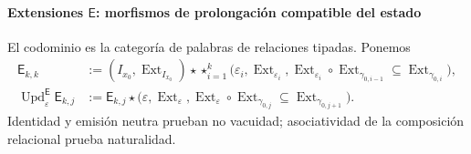 \paragraph{Extensiones \(\mathsf E\): morfismos de prolongación compatible del estado}
El codominio es la categoría de palabras de relaciones tipadas. Ponemos
\begin{align}
 \mathsf E_{k,k}
 &:=(I_{x_0},\operatorname{Ext}_{I_{x_0}})\star
 \mathop{\star}_{i=1}^{k}
 \bigl(\varepsilon_i,\operatorname{Ext}_{\varepsilon_i},
 \operatorname{Ext}_{\varepsilon_i}\circ
 \operatorname{Ext}_{\gamma_{0,i-1}}
 \subseteq\operatorname{Ext}_{\gamma_{0,i}}\bigr),
 \label{eq:pdfv2-terminal-semilla-e}\\
 \operatorname{Upd}^{\mathsf E}_{\varepsilon}\mathsf E_{k,j}
 &:=
 \mathsf E_{k,j}\star
 \bigl(\varepsilon,\operatorname{Ext}_{\varepsilon},
 \operatorname{Ext}_{\varepsilon}\circ
 \operatorname{Ext}_{\gamma_{0,j}}
 \subseteq\operatorname{Ext}_{\gamma_{0,j+1}}\bigr).
 \label{eq:pdfv2-terminal-update-e}
\end{align}
Identidad y emisión neutra prueban no vacuidad; asociatividad de la
composición relacional prueba naturalidad.

